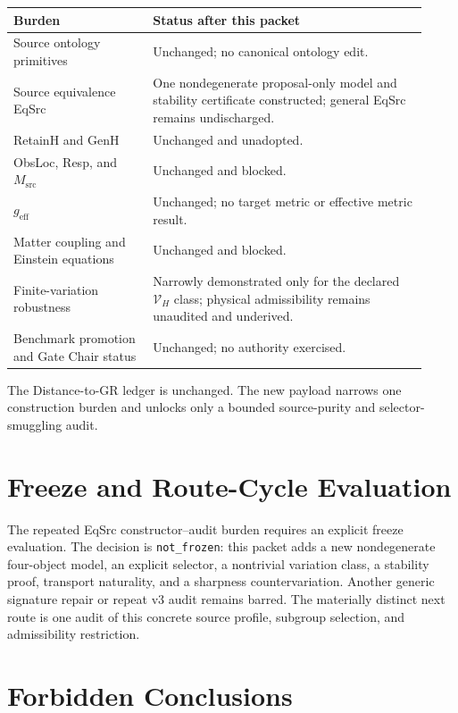 \documentclass[11pt]{article}
\newcommand{\Vary}{\mathcal V_H}
\begin{document}
\begin{longtable}{p{0.31\linewidth}p{0.61\linewidth}}
\toprule
Burden & Status after this packet\\
\midrule
Source ontology primitives & Unchanged; no canonical ontology edit.\\
Source equivalence EqSrc & One nondegenerate proposal-only model and stability certificate constructed; general EqSrc remains undischarged.\\
RetainH and GenH & Unchanged and unadopted.\\
ObsLoc, Resp, and \(M_{\mathrm{src}}\) & Unchanged and blocked.\\
\(g_{\mathrm{eff}}\) & Unchanged; no target metric or effective metric result.\\
Matter coupling and Einstein equations & Unchanged and blocked.\\
Finite-variation robustness & Narrowly demonstrated only for the declared \(\Vary\) class; physical admissibility remains unaudited and underived.\\
Benchmark promotion and Gate Chair status & Unchanged; no authority exercised.\\
\bottomrule
\end{longtable}

The Distance-to-GR ledger is unchanged. The new payload narrows one
construction burden and unlocks only a bounded source-purity and
selector-smuggling audit.

\section{Freeze and Route-Cycle Evaluation}

The repeated EqSrc constructor--audit burden requires an explicit freeze
evaluation. The decision is \texttt{not\_frozen}: this packet adds a new
nondegenerate four-object model, an explicit selector, a nontrivial variation
class, a stability proof, transport naturality, and a sharpness
countervariation. Another generic signature repair or repeat v3 audit remains
barred. The materially distinct next route is one audit of this concrete
source profile, subgroup selection, and admissibility restriction.

\section{Forbidden Conclusions}
\end{document}
